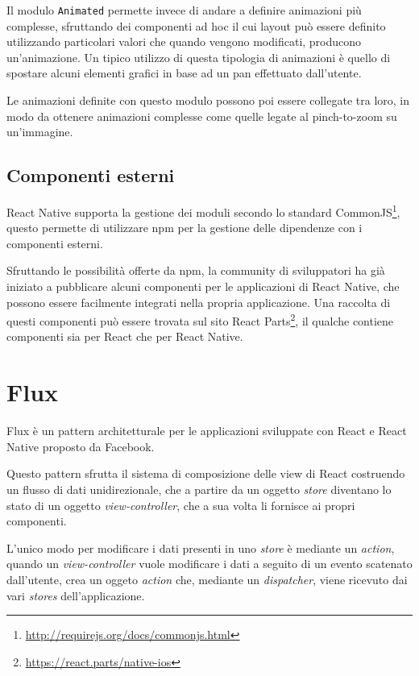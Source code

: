 Il modulo \texttt{Animated} permette invece di andare a definire animazioni più complesse, sfruttando dei componenti ad hoc il cui layout può essere definito utilizzando particolari valori che quando vengono modificati, producono un'animazione.
Un tipico utilizzo di questa tipologia di animazioni è quello di spostare alcuni elementi grafici in base ad un \gls{pan} effettuato dall'utente.

Le animazioni definite con questo modulo possono poi essere collegate tra loro, in modo da ottenere animazioni complesse come quelle legate al \gls{pinch-to-zoom} su un'immagine.

\subsection{Componenti esterni}

React Native supporta la gestione dei moduli secondo lo standard CommonJS\footnote{\url{http://requirejs.org/docs/commonjs.html}}, questo permette di utilizzare npm per la gestione delle dipendenze con i componenti esterni.

Sfruttando le possibilità offerte da npm, la community di sviluppatori ha già iniziato a pubblicare alcuni componenti per le applicazioni di React Native, che possono essere facilmente integrati nella propria applicazione.
Una raccolta di questi componenti può essere trovata sul sito React Parts\footnote{\url{https://react.parts/native-ios}}, il qualche contiene componenti sia per React che per React Native.

\section{Flux}\label{sec:flux}
Flux è un pattern architetturale per le applicazioni sviluppate con React e React Native proposto da Facebook.

Questo pattern sfrutta il sistema di composizione delle view di React costruendo un flusso di dati unidirezionale, che a partire da un oggetto \textit{store} diventano lo stato di un oggetto \textit{view-controller}, che a sua volta li fornisce ai propri componenti.

L'unico modo per modificare i dati presenti in uno \textit{store} è mediante un \textit{action}, quando un \textit{view-controller} vuole modificare i dati a seguito di un evento scatenato dall'utente, crea un oggeto \textit{action} che, mediante un \textit{dispatcher}, viene ricevuto dai vari \textit{stores} dell'applicazione.

